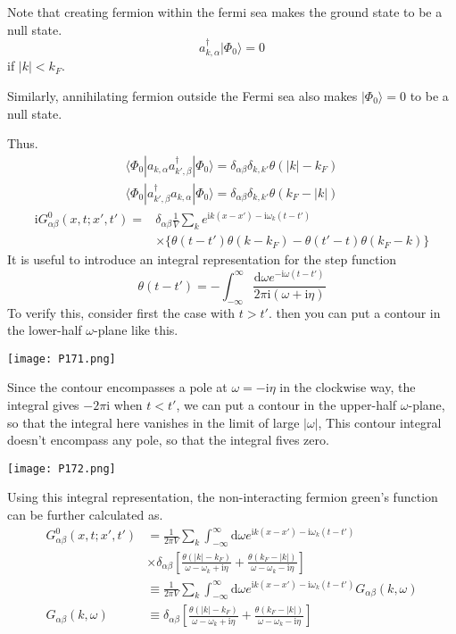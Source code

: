 ﻿\documentclass[twoside]{book}
\numberwithin{equation}{section}
\begin{document}
Note that creating fermion within the fermi sea makes the ground state to be a null state.
\begin{equation}
a^{\dagger}_{k,\alpha} |\Phi_0\rangle=0 \nonumber
\end{equation}
if $|k|<k_F$.

Similarly, annihilating fermion outside the Fermi sea also makes $|\Phi_0\rangle=0$ to be a null state.

Thus.
\begin{align}
 \langle\Phi_0|a_{k,\alpha}a^{\dagger}_{k',\beta}|\Phi_0\rangle=\delta_{\alpha\beta}\delta_{k,k'}\theta(|k|-k_F) \nonumber \\ \langle\Phi_0|a^{\dagger}_{k',\beta}a_{k,\alpha}|\Phi_0\rangle=\delta_{\alpha\beta}\delta_{k,k'}\theta(k_F-|k|) \nonumber 
\end{align}
\begin{align}
\mathrm{i}G^0_{\alpha\beta}(x,t;x',t')=&\delta_{\alpha\beta}\frac{1}{V}\sum_{k}e^{\mathrm{i}k(x-x')-\mathrm{i}\omega_{k}(t-t')} \nonumber\\
&\times\{\theta(t-t')\theta(k-k_F)-\theta(t'-t)\theta(k_F-k)\} \nonumber
\end{align}
It is useful to introduce an integral representation for the step function
\begin{equation}
\theta(t-t')=-\int_{-\infty}^{\infty} \frac{\mathrm{d}\omega e^{-\mathrm{i}\omega(t-t')}}{2\pi\mathrm{i}(\omega+\mathrm{i}\eta)} \nonumber
\end{equation}
To verify this, consider first the case with $t>t'$. then you can put a contour in the lower-half $\omega$-plane like this.
\begin{center}
\texttt{[image: P171.png]}
\end{center}
Since the contour encompasses a pole at $\omega=-\mathrm{i}\eta$ in the clockwise way, the integral gives $-2\pi\mathrm{i}$ when $t<t'$, we can put a contour in the upper-half $\omega$-plane, so that the integral here vanishes in the limit of large $|\omega|$, This contour integral doesn't encompass any pole, so that the integral fives zero.

\begin{center}
\texttt{[image: P172.png]}
\end{center}
Using this integral representation, the non-interacting fermion green's function can be further calculated as.  
\begin{align}\label{2.3.6}
G^0_{\alpha\beta}(x,t;x',t')&=\frac{1}{2\pi V}\sum_k \int_{-\infty}^{\infty} \mathrm{d}\omega e^{\mathrm{i}k(x-x')-\mathrm{i}\omega_{k}(t-t')} \nonumber \\
& \times \delta_{\alpha\beta}[\frac{\theta(|k|-k_F)}{\omega-\omega_k+\mathrm{i}\eta}+\frac{\theta(k_F-|k|)}{\omega-\omega_k-\mathrm{i}\eta}] \nonumber \\
&\equiv \frac{1}{2\pi V}\sum_k \int_{-\infty}^{\infty}\mathrm{d}\omega e^{\mathrm{i}k(x-x')-\mathrm{i}\omega_{k}(t-t')} G_{\alpha\beta}(k,\omega) \nonumber \\
G_{\alpha\beta}(k,\omega)&\equiv \delta_{\alpha\beta}[\frac{\theta(|k|-k_F)}{\omega-\omega_k+\mathrm{i}\eta}+\frac{\theta(k_F-|k|)}{\omega-\omega_k-\mathrm{i}\eta}] 
\end{align}
\end{document}

